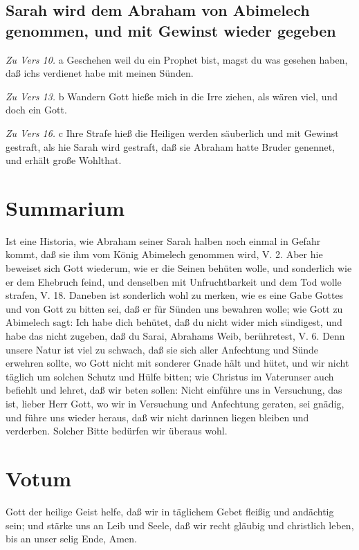 \subsection[Sarah wird dem Abraham von Abimelech genommen, und]{Sarah wird dem Abraham von Abimelech genommen, und mit Gewinst wieder gegeben}

\emph{Zu Vers 10.} a Geschehen weil du ein Prophet bist, magst du was gesehen haben, daß ichs verdienet habe mit meinen Sünden.

\emph{Zu Vers 13.} b Wandern Gott hieße mich in die Irre ziehen, als wären viel, und doch ein Gott.

\emph{Zu Vers 16.} c Ihre Strafe hieß die Heiligen werden säuberlich und mit Gewinst gestraft, als hie Sarah wird gestraft, daß sie Abraham hatte Bruder genennet, und erhält große Wohlthat.

\section{Summarium}

Ist eine Historia, wie Abraham seiner Sarah halben noch einmal in Gefahr kommt, daß sie ihm vom König Abimelech genommen wird, V. 2. Aber hie beweiset sich Gott wiederum, wie er die Seinen behüten wolle, und sonderlich wie er dem Ehebruch feind, und denselben mit Unfruchtbarkeit und dem Tod wolle strafen, V. 18. Daneben ist sonderlich wohl zu merken, wie es eine Gabe Gottes und von Gott zu bitten sei, daß er für Sünden uns bewahren wolle; wie Gott zu Abimelech sagt: Ich habe dich behütet, daß du nicht wider mich sündigest,
und habe das nicht zugeben, daß du Sarai, Abrahams Weib, berühretest, V. 6. Denn unsere Natur ist viel zu schwach, daß sie sich aller Anfechtung und Sünde erwehren sollte, wo Gott nicht mit sonderer Gnade hält und hütet, und wir nicht täglich um solchen Schutz und Hülfe bitten; wie Christus im Vaterunser auch befiehlt und lehret, daß wir beten sollen: Nicht einführe uns in Versuchung, das ist, lieber Herr Gott, wo wir in Versuchung und Anfechtung geraten, sei gnädig, und führe uns wieder heraus, daß wir nicht darinnen liegen bleiben und verderben. Solcher Bitte bedürfen wir überaus wohl.

\section{Votum}

Gott der heilige Geist helfe, daß wir in täglichem Gebet fleißig und andächtig sein; und stärke uns an Leib und Seele, daß wir recht gläubig und christlich leben, bis an unser selig Ende, Amen.

